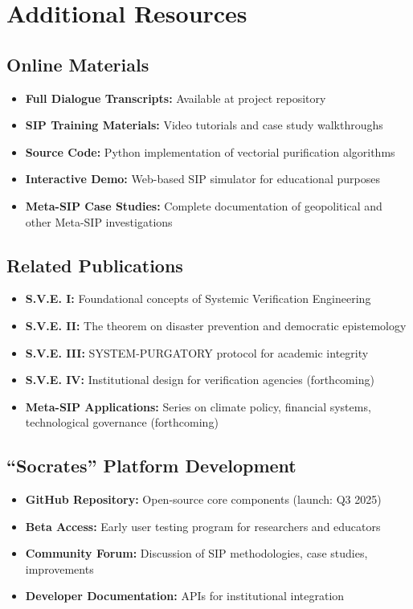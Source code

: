 \documentclass[11pt,a4paper]{article}
\begin{document}
\section{Additional Resources}
\label{app:resources}

\subsection*{Online Materials}
\begin{itemize}[leftmargin=*]
    \item \textbf{Full Dialogue Transcripts:} Available at project repository
    \item \textbf{SIP Training Materials:} Video tutorials and case study walkthroughs
    \item \textbf{Source Code:} Python implementation of vectorial purification algorithms
    \item \textbf{Interactive Demo:} Web-based SIP simulator for educational purposes
    \item \textbf{Meta-SIP Case Studies:} Complete documentation of geopolitical and other Meta-SIP investigations
\end{itemize}

\subsection*{Related Publications}
\begin{itemize}[leftmargin=*]
    \item \textbf{S.V.E. I:} Foundational concepts of Systemic Verification Engineering
    \item \textbf{S.V.E. II:} The theorem on disaster prevention and democratic epistemology
    \item \textbf{S.V.E. III:} SYSTEM-PURGATORY protocol for academic integrity \citep{KovnatskySVE3}
    \item \textbf{S.V.E. IV:} Institutional design for verification agencies (forthcoming)
    \item \textbf{Meta-SIP Applications:} Series on climate policy, financial systems, technological governance (forthcoming)
\end{itemize}

\subsection*{``Socrates'' Platform Development}
\begin{itemize}[leftmargin=*]
    \item \textbf{GitHub Repository:} Open-source core components (launch: Q3 2025)
    \item \textbf{Beta Access:} Early user testing program for researchers and educators
    \item \textbf{Community Forum:} Discussion of SIP methodologies, case studies, improvements
    \item \textbf{Developer Documentation:} APIs for institutional integration
\end{itemize}
\end{document}
